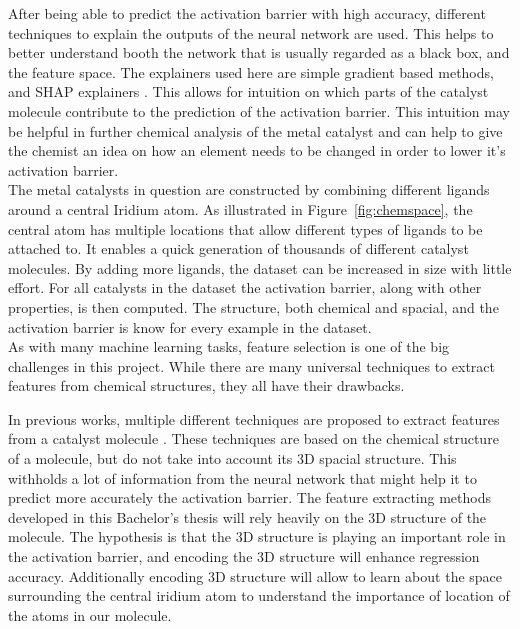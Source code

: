 After being able to predict the activation barrier with high accuracy, different techniques to explain the 
outputs of the neural network are used.
This helps to better understand booth the network that is usually regarded as a black box, and the feature space.
The explainers used here are simple gradient based methods, and SHAP explainers \cite{NIPS2017_7062}.
This allows for intuition on which parts of the catalyst molecule contribute to the prediction of the activation barrier.
This intuition may be helpful in further chemical analysis of the metal catalyst and can help to give the 
chemist an idea on how an element needs to be changed in order to lower it's activation barrier.
\\

The metal catalysts in question are constructed by combining different ligands around a central Iridium atom.
As illustrated in Figure~\ref{fig:chemspace}, the central atom has multiple locations that allow different types of ligands to be attached to.  
It enables a quick generation of thousands of different catalyst molecules.
By adding more ligands, the dataset can be increased in size with little effort.
For all catalysts in the dataset the activation barrier, along with other properties, is then computed.
The structure, both chemical and spacial, and the activation barrier is know for every example in the dataset. 
\\
As with many machine learning tasks, feature selection is one of the big challenges in this project.
While there are many universal techniques to extract features from chemical structures, they all have their drawbacks.

In previous works, multiple different techniques are proposed to extract features from a catalyst molecule \cite{friederich_dos}.
These techniques are based on the chemical structure of a molecule, but do not take into account its 3D spacial structure.
This withholds a lot of information from the neural network that might help it to predict more accurately the activation barrier.
The feature extracting methods developed in this Bachelor's thesis will rely heavily on the 3D structure of the molecule.
The hypothesis is that the 3D structure is playing an important role in the activation barrier, and encoding the 3D structure will enhance regression accuracy.
Additionally encoding 3D structure will allow to learn about the space surrounding the central 
iridium atom to understand the importance of location of the atoms in our molecule.

